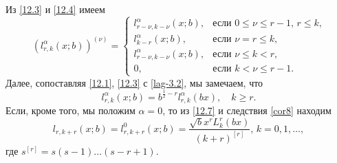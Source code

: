 Из \eqref{12.3} и \eqref{12.4} имеем
\begin{equation}\label{12.6}
(l^\alpha_{r,k}(x;b))^{(\nu)} =\begin{cases}l^\alpha_{r-\nu,k-\nu}(x;b),&\text{если $0\le\nu\le r-1$, $r\le k$,}\\
l^\alpha_{k-r}(x;b),&\text{если  $\nu=r\le k$,}\\
l^\alpha_{r-\nu,k-\nu}(x;b),&\text{если $\nu\le k< r$,}\\
0,&\text{если $k< \nu\le r-1$}.
\end{cases}
\end{equation}
Далее, сопоставляя \eqref{12.1}, \eqref{12.3} с \eqref{lag-3.2}, мы замечаем, что
\begin{equation}\label{12.7}
{l}_{r,k}^{\alpha}(x;b)=b^{\frac12-r}l_{r,k}^\alpha(bx), \quad k\ge r.
\end{equation}
Если, кроме того,  мы положим $\alpha=0$, то из \eqref{12.7} и следствия \ref{cor8} находим
\begin{equation}\label{12.8}
{l}_{r,k+r}(x;b)={l}_{r,k+r}^{0}(x;b)=\frac{\sqrt{b}x^rL_{k}^r(bx)}{(k+r)^{[r]}}, \,k=0,1,\ldots,
\end{equation}
где $s^{[r]}=s(s-1)\ldots (s-r+1)$.

